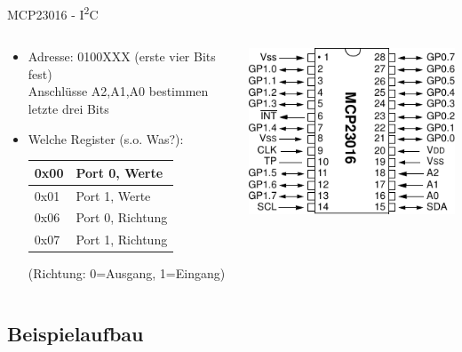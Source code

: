 \documentclass{beamer}
\newcommand{\ItC}{I\textsuperscript{2}C\xspace}
\begin{document}
\begin{frame}{MCP23016 - \ItC}\begin{columns}
\begin{column}{.7\textwidth}
 \begin{itemize}
  \item Adresse: 0100XXX (erste vier Bits fest)\\Anschlüsse A2,A1,A0 bestimmen letzte drei Bits
  \item Welche Register (s.o. Was?):
   \begin{tabular}{|l|l|}\hline
    0x00 & Port 0, Werte\\\hline
    0x01 & Port 1, Werte\\\hline
    0x06 & Port 0, Richtung\\\hline
    0x07 & Port 1, Richtung\\\hline
   \end{tabular}
   
   (Richtung: 0=Ausgang, 1=Eingang)
 \end{itemize}
 \end{column}
  \begin{column}{.3\textwidth}
 \includegraphics[width=\textwidth]{MCP23016}
  \end{column}
 \end{columns}
\end{frame}

\subsection{Beispielaufbau}
\end{document}
